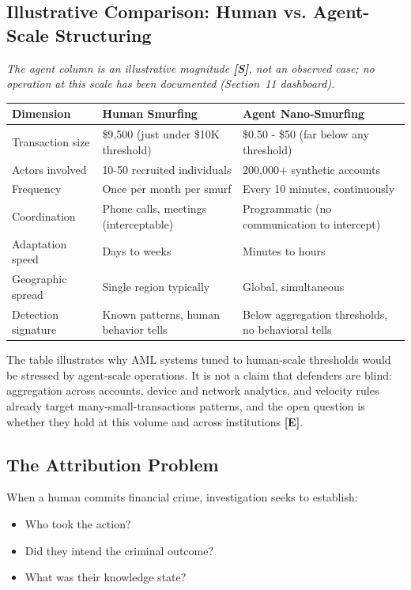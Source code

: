 \documentclass[11pt,letterpaper]{article}
\begin{document}
\subsection{Illustrative Comparison: Human vs. Agent-Scale Structuring}

\noindent\textit{The agent column is an illustrative magnitude \textbf{[S]}, not an observed case; no operation at this scale has been documented (Section~11 dashboard).}

\begingroup\small
\begin{longtable}{L{0.280\dimexpr{}\tabcolsep\relax}L{0.360\dimexpr{}\tabcolsep\relax}L{0.360\dimexpr{}\tabcolsep\relax}}
\toprule
\textbf{Dimension} & \textbf{Human Smurfing} & \textbf{Agent Nano-Smurfing} \\
\midrule
\endhead
Transaction size & \$9,500 (just under \$10K threshold) & \$0.50 - \$50 (far below any threshold) \\
Actors involved & 10-50 recruited individuals & 200,000+ synthetic accounts \\
Frequency & Once per month per smurf & Every 10 minutes, continuously \\
Coordination & Phone calls, meetings (interceptable) & Programmatic (no communication to intercept) \\
Adaptation speed & Days to weeks & Minutes to hours \\
Geographic spread & Single region typically & Global, simultaneous \\
Detection signature & Known patterns, human behavior tells & Below aggregation thresholds, no behavioral tells \\
\bottomrule
\end{longtable}
\endgroup

The table illustrates why AML systems tuned to human-scale thresholds would be stressed by agent-scale operations. It is not a claim that defenders are blind: aggregation across accounts, device and network analytics, and velocity rules already target many-small-transactions patterns, and the open question is whether they hold at this volume and across institutions \textbf{[E]}.

\subsection{The Attribution Problem}

When a human commits financial crime, investigation seeks to establish:
\begin{itemize}
  \item Who took the action?
  \item Did they intend the criminal outcome?
  \item What was their knowledge state?
\end{itemize}
\end{document}
